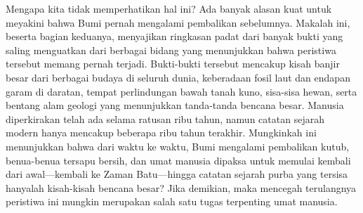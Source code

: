\documentclass[10pt,twocolumn,letterpaper]{article}
\begin{document}
Mengapa kita tidak memperhatikan hal ini? Ada banyak alasan kuat untuk meyakini bahwa Bumi pernah mengalami pembalikan sebelumnya. Makalah ini, beserta bagian keduanya, menyajikan ringkasan padat dari banyak bukti yang saling menguatkan dari berbagai bidang yang menunjukkan bahwa peristiwa tersebut memang pernah terjadi. Bukti-bukti tersebut mencakup kisah banjir besar dari berbagai budaya di seluruh dunia, keberadaan fosil laut dan endapan garam di daratan, tempat perlindungan bawah tanah kuno, sisa-sisa hewan, serta bentang alam geologi yang menunjukkan tanda-tanda bencana besar. Manusia diperkirakan telah ada selama ratusan ribu tahun, namun catatan sejarah modern hanya mencakup beberapa ribu tahun terakhir. Mungkinkah ini menunjukkan bahwa dari waktu ke waktu, Bumi mengalami pembalikan kutub, benua-benua tersapu bersih, dan umat manusia dipaksa untuk memulai kembali dari awal—kembali ke Zaman Batu—hingga catatan sejarah purba yang tersisa hanyalah kisah-kisah bencana besar? Jika demikian, maka mencegah terulangnya peristiwa ini mungkin merupakan salah satu tugas terpenting umat manusia.
\end{document}
